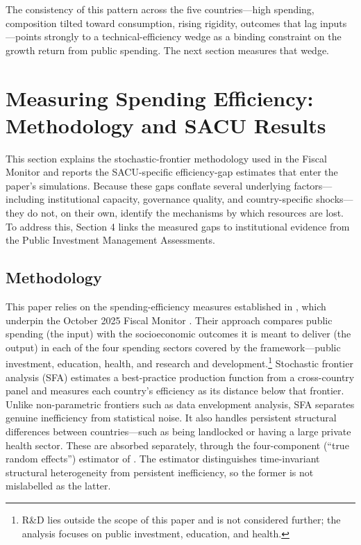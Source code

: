 \documentclass[11pt]{article}
\begin{document}
The consistency of this pattern across the five countries---high spending, composition tilted toward consumption, rising rigidity, outcomes that lag inputs---points strongly to a technical-efficiency wedge as a binding constraint on the growth return from public spending. The next section measures that wedge.


\section{Measuring Spending Efficiency: Methodology and SACU Results}
\label{sec:efficiency}

This section explains the stochastic-frontier methodology used in the Fiscal
Monitor \parencite{imf2025fm} and reports the SACU-specific efficiency-gap
estimates that enter the paper's simulations. Because these gaps conflate
several underlying factors---including institutional capacity, governance
quality, and country-specific shocks---they do not, on their own, identify
the mechanisms by which resources are lost. To address this, Section 4
links the measured gaps to institutional evidence from the Public
Investment Management Assessments.

\subsection{Methodology}
\label{sec:methodology}

This paper relies on the spending-efficiency measures established in
\textcite{bankowskichosher2026}, which underpin the October 2025 Fiscal
Monitor \parencite{imf2025fm}. Their approach compares public spending (the input) with
the socioeconomic outcomes it is meant to deliver (the output) in each of the
four spending sectors covered by the framework---public investment, education,
health, and research and development.\footnote{R\&D lies outside the scope of
this paper and is not considered further; the analysis focuses on public
investment, education, and health.} Stochastic frontier analysis (SFA) estimates
a best-practice production function from a cross-country panel and measures each
country's efficiency as its distance below that frontier. Unlike non-parametric
frontiers such as data envelopment analysis, SFA separates genuine inefficiency
from statistical noise. It also handles persistent structural differences
between countries---such as being landlocked or having a large private health
sector. These are absorbed separately, through the four-component (``true random
effects'') estimator of \textcite{filippinigreene2016}. The estimator
distinguishes time-invariant structural heterogeneity from persistent
inefficiency, so the former is not mislabelled as the latter.
\end{document}
